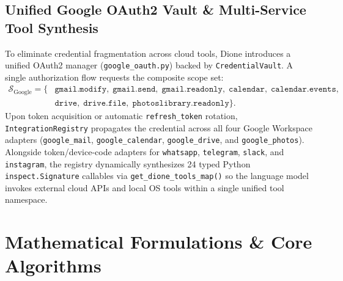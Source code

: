 \documentclass[10pt,a4paper]{article}
\begin{document}
\subsection{Unified Google OAuth2 Vault \& Multi-Service Tool Synthesis}
To eliminate credential fragmentation across cloud tools, Dione introduces a unified OAuth2 manager (\texttt{google\_oauth.py}) backed by \texttt{CredentialVault}. A single authorization flow requests the composite scope set:
\begin{equation*}
\begin{aligned}
\mathcal{S}_{\text{Google}} = \{&\texttt{gmail.modify},\; \texttt{gmail.send},\; \texttt{gmail.readonly},\; \texttt{calendar},\; \texttt{calendar.events}, \\
&\texttt{drive},\; \texttt{drive.file},\; \texttt{photoslibrary.readonly}\}.
\end{aligned}
\end{equation*}
Upon token acquisition or automatic \texttt{refresh\_token} rotation, \texttt{IntegrationRegistry} propagates the credential across all four Google Workspace adapters (\texttt{google\_mail}, \texttt{google\_calendar}, \texttt{google\_drive}, and \texttt{google\_photos}). Alongside token/device-code adapters for \texttt{whatsapp}, \texttt{telegram}, \texttt{slack}, and \texttt{instagram}, the registry dynamically synthesizes 24 typed Python \texttt{inspect.Signature} callables via \texttt{get\_dione\_tools\_map()} so the language model invokes external cloud APIs and local OS tools within a single unified tool namespace.

\section{Mathematical Formulations \& Core Algorithms}
\end{document}
